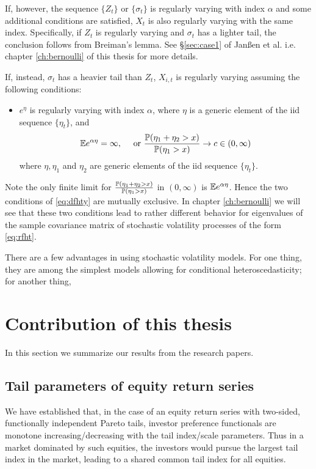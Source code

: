 If, however, the sequence $\{Z_t\}$ or $\{\sigma_t\}$ is regularly
varying with index $\alpha$ and some additional conditions are
satisfied, $X_t$ is also regularly varying with the same
index. Specifically, if $Z_t$ is regularly varying and $\sigma_t$ has
a lighter tail, the conclusion follows from Breiman's lemma. See
\S\ref{sec:case1} of Jan\ss en et al. i.e. chapter \ref{ch:bernoulli}
of this thesis for more details.

If, instead, $\sigma_t$ has a heavier tail than $Z_t$, $X_{i,t}$ is
regularly varying assuming the following conditions:
\begin{itemize}
\item $e^\eta$ is regularly varying with index $\alpha$, where $\eta$
  is a generic element of the iid sequence $\{\eta_t\}$, and
  \begin{equation}
    \label{eq:dfhty}
    \E e^{\alpha \eta} = \infty, \quad\text{ or }
    {\P(\eta_1 + \eta_2 > x) \over \P(\eta_1 > x)} \to c \in (0, \infty)
  \end{equation}
    where $\eta, \eta_1$ and $\eta_2$ are generic elements of the
    iid sequence $\{\eta_t\}$.
\end{itemize}
Note the only finite limit for
${\P(\eta_1 + \eta_2 > x) \over \P(\eta_1 > x)}$ in $(0, \infty)$ is
$\E e^{\alpha \eta}$. Hence the two conditions of \eqref{eq:dfhty}
are mutually exclusive. In chapter \ref{ch:bernoulli} we will see that
these two conditions lead to rather different behavior for
eigenvalues of the sample covariance matrix of stochastic volatility
processes of the form \eqref{eq:rfht}.

There are a few advantages in using stochastic volatility models. For
one thing, they are among the simplest models allowing for conditional
heteroscedasticity; for another thing,

\section{Contribution of this thesis}\label{sec:contr}

In this section we summarize our results from the research papers.

\subsection{Tail parameters of equity return series}
We have established that, in the case of an equity return series with
two-sided, functionally independent Pareto tails, investor
preference functionals are monotone increasing/decreasing with the
tail index/scale parameters. Thus in a market dominated by such
equities, the investors would pursue the largest tail index in the
market, leading to a shared common tail index for all equities.

